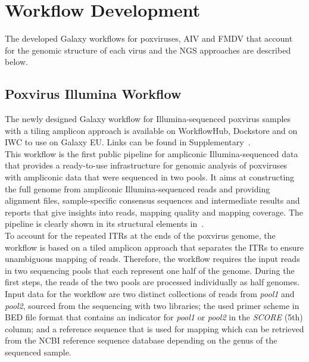 \section{Workflow Development}
The developed Galaxy workflows for poxviruses, \ac{AIV} and \ac{FMDV} that account for the genomic structure of each virus and the \ac{NGS} approaches are described below.

\subsection{Poxvirus Illumina Workflow}\label{sec:pox-wf}
The newly designed Galaxy workflow for Illumina-sequenced poxvirus samples with a tiling amplicon approach is available on WorkflowHub, Dockstore and on \ac{IWC} to use on Galaxy EU. Links can be found in Supplementary~. \\
This workflow is the first public pipeline for ampliconic Illumina-sequenced data that provides a ready-to-use infrastructure for genomic analysis of poxviruses with ampliconic data that were sequenced in two pools. It aims at constructing the full genome from ampliconic Illumina-sequenced reads and providing alignment files, sample-specific consensus sequences and intermediate results and reports that give insights into reads, mapping quality and mapping coverage. The pipeline is clearly shown in its structural elements in~. \\ 
To account for the repeated \acp{ITR} at the ends of the poxvirus genome, the workflow is based on a tiled amplicon approach that separates the \acp{ITR} to ensure unambiguous mapping of reads. Therefore, the workflow requires the input reads in two sequencing pools that each represent one half of the genome. During the first steps, the reads of the two pools are processed individually as half genomes. Input data for the workflow are two distinct collections of reads from \textit{pool1} and \textit{pool2}, sourced from the sequencing with two libraries; the used primer scheme in \ac{BED} file format that contains an indicator for \textit{pool1} or \textit{pool2} in the \textit{SCORE} (5th) column; and a reference sequence that is used for mapping which can be retrieved from the \ac{NCBI} reference sequence database depending on the genus of the sequenced sample. 


